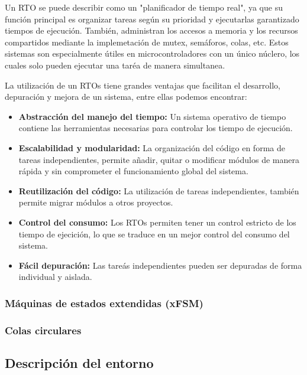 		Un RTO se puede describir como un "planificador de tiempo real", ya que su función principal es organizar tareas según su prioridad y ejecutarlas garantizado tiempos de ejecución. También, administran los accesos a memoria y los recursos compartidos mediante la implemetación de mutex, semáforos, colas, etc. Estos sistemas son especialmente útiles en microcontroladores con un único núclero, los cuales solo pueden ejecutar una taréa de manera simultanea.
		
		La utilización de un RTOs tiene grandes ventajas que facilitan el desarrollo, depuración y mejora de un sistema, entre ellas podemos encontrar:
		
		\begin{itemize}
			\item \textbf{Abstracción del manejo del tiempo: }Un sistema operativo de tiempo contiene las herramientas necesarias para controlar los tiempo de ejecución. 
			\item \textbf{Escalabilidad y modularidad: }La organización del código en forma de tareas independientes, permite añadir, quitar o modificar módulos de manera rápida y sin comprometer el funcionamiento global del sistema.
			\item \textbf{Reutilización del código: }La utilización de tareas independientes, también permite migrar módulos a otros proyectos.
			
			\item \textbf{Control del consumo: }Los RTOs permiten tener un control estricto de los tiempo de ejecición, lo que se traduce en un mejor control del consumo del sistema.
			
			\item \textbf{Fácil depuración: }Las tareás independientes pueden ser depuradas de forma individual y aislada.
			
			 
		\end{itemize}
		
				
		\subsubsection{Máquinas de estados extendidas (xFSM)}
		
		
		
		\subsubsection{Colas circulares }
		
	\subsection{Descripción del entorno}
